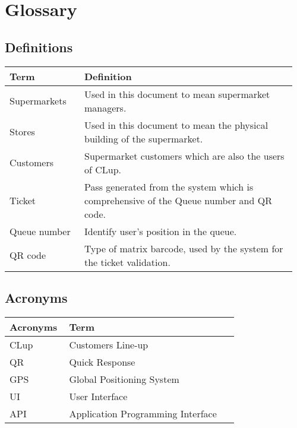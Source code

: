 \section{Glossary}
\subsection{Definitions}
\begin{center}
	\begin{tabular}{@{}p{0.25\linewidth} p{0.71\linewidth}@{}}
		\toprule
		\textbf{Term} & \textbf{Definition}\\
		\midrule
		Supermarkets & Used in this document to mean supermarket managers.\\
		Stores & Used in this document to mean the physical building of the supermarket.\\
		Customers & Supermarket customers which are also the users of CLup.\\
		Ticket & Pass generated from the system which is comprehensive of the Queue number and QR code.\\
		Queue number & Identify user's position in the queue.\\
		QR code & Type of matrix barcode, used by the system for the ticket validation.\\

		\bottomrule
	\end{tabular}
\end{center}

\subsection{Acronyms}
\begin{center}
	\begin{tabular}{@{}p{0.25\linewidth} p{0.71\linewidth}@{}}
		\toprule
		\textbf{Acronyms} & \textbf{Term}\\
		\midrule
		CLup & Customers Line-up\\
		QR & Quick Response\\
		GPS & Global Positioning System\\
		UI & User Interface\\
		API & Application Programming Interface\\
		\bottomrule
	\end{tabular}
\end{center}

